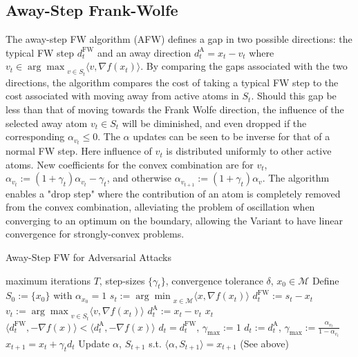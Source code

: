 \documentclass{article}
\begin{document}
\subsection{Away-Step Frank-Wolfe}
The away-step FW algorithm (AFW) defines a gap in two possible directions: the typical FW step $d_t^\text{FW}$ and an away direction $d_t^\text{A} = x_t - v_t$ where $v_t  \in {\arg \max}_{v\in S_t} \langle v, \nabla f(x_t)\rangle$. By comparing the gaps associated with the two directions, the algorithm compares the cost of taking a typical FW step to the cost associated with moving away from active atoms in $S_t$. Should this gap be less than that of moving towards the Frank Wolfe direction, the influence of the selected away atom $v_t\in S_t$ will be diminished, and even dropped if the corresponding $\alpha_{v_t} \leq 0$. 
The $\alpha$ updates can be seen to be inverse for that of a normal FW step. Here influence of $v_t$ is distributed uniformly to other active atoms. New coefficients for the convex combination are for $v_t$, $\alpha_{v_{t}} := (1+\gamma_t)\alpha_{v_t} - \gamma_t$, and otherwise $\alpha_{v_{t+1}} := (1+\gamma_t)\alpha_{v}$. 
The algorithm enables a "drop step" where the contribution of an atom is completely removed from the convex combination, alleviating the problem of oscillation when converging to an optimum on the boundary, allowing the Variant to have linear convergence for strongly-convex problems.
\begin{algorithm}[H]
\caption{Away-Step FW for Adversarial Attacks}\label{alg:cap}
\begin{algorithmic}[1]
\Require maximum iterations $T$, step-sizes $\{\gamma_t\}$, convergence tolerance $\delta$, $x_0 \in \mathcal{M}$
\State Define $S_0 := \{x_0\}$ with $\alpha_{x_0} = 1$
	\State $s_t  := {\arg \min}_{x\in\mathcal{M}} \langle x, \nabla f(x_t)\rangle$ 
	\State $d_t^{\text{FW}} := s_t - x_t$
	\State $v_t  := {\arg \max}_{v\in S_t} \langle v, \nabla f(x_t)\rangle$
	\State $d_t^{\text{A}} := x_t - v_t$
	  $x_t$ \hfill {}
	\EndIf
	\If $\langle d_t^\text{FW}, -\nabla f(x)\rangle < \langle d_t^\text{A}, -\nabla f(x)\rangle$
		\State $d_t = d_t^\text{FW}$, $\gamma_\text{max} := 1$
	\Else
		\State $d_t := d_t^\text{A}$, $\gamma_\text{max} := \frac{\alpha_{v_t}}{1- \alpha_{v_t}}$
	\EndIf
	\State $x_{t+1} = x_t + \gamma_t d_t$
	\State Update $\alpha$, $S_{t+1}$ s.t. $\langle \alpha, S_{t+1}\rangle = x_{t+1}$ (See above)
\EndFor
\end{algorithmic}
\end{algorithm}
\end{document}
